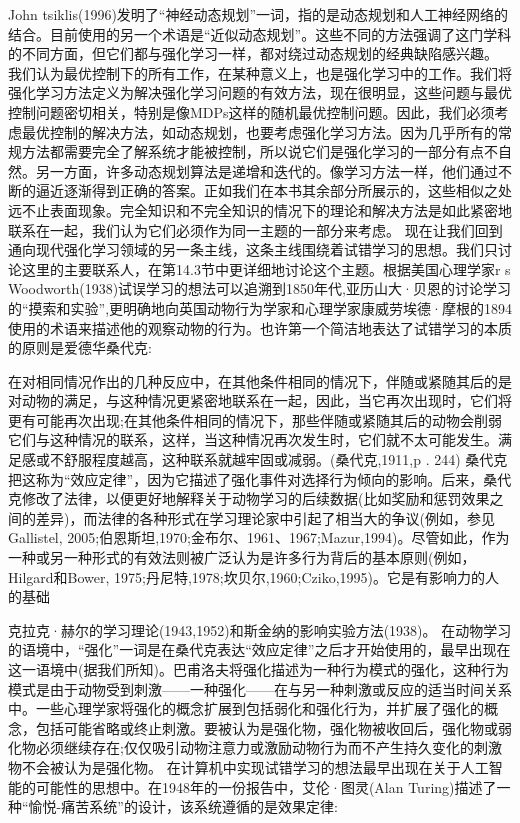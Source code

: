 John tsiklis(1996)发明了“神经动态规划”一词，指的是动态规划和人工神经网络的结合。目前使用的另一个术语是“近似动态规划”。这些不同的方法强调了这门学科的不同方面，但它们都与强化学习一样，都对绕过动态规划的经典缺陷感兴趣。
我们认为最优控制下的所有工作，在某种意义上，也是强化学习中的工作。我们将强化学习方法定义为解决强化学习问题的有效方法，现在很明显，这些问题与最优控制问题密切相关，特别是像MDPs这样的随机最优控制问题。因此，我们必须考虑最优控制的解决方法，如动态规划，也要考虑强化学习方法。因为几乎所有的常规方法都需要完全了解系统才能被控制，所以说它们是强化学习的一部分有点不自然。另一方面，许多动态规划算法是递增和迭代的。像学习方法一样，他们通过不断的逼近逐渐得到正确的答案。正如我们在本书其余部分所展示的，这些相似之处远不止表面现象。完全知识和不完全知识的情况下的理论和解决方法是如此紧密地联系在一起，我们认为它们必须作为同一主题的一部分来考虑。
现在让我们回到通向现代强化学习领域的另一条主线，这条主线围绕着试错学习的思想。我们只讨论这里的主要联系人，在第14.3节中更详细地讨论这个主题。根据美国心理学家r s Woodworth(1938)试误学习的想法可以追溯到1850年代,亚历山大·贝恩的讨论学习的“摸索和实验”,更明确地向英国动物行为学家和心理学家康威劳埃德·摩根的1894使用的术语来描述他的观察动物的行为。也许第一个简洁地表达了试错学习的本质的原则是爱德华桑代克:

在对相同情况作出的几种反应中，在其他条件相同的情况下，伴随或紧随其后的是对动物的满足，与这种情况更紧密地联系在一起，因此，当它再次出现时，它们将更有可能再次出现;在其他条件相同的情况下，那些伴随或紧随其后的动物会削弱它们与这种情况的联系，这样，当这种情况再次发生时，它们就不太可能发生。满足感或不舒服程度越高，这种联系就越牢固或减弱。(桑代克,1911,p . 244)
桑代克把这称为“效应定律”，因为它描述了强化事件对选择行为倾向的影响。后来，桑代克修改了法律，以便更好地解释关于动物学习的后续数据(比如奖励和惩罚效果之间的差异)，而法律的各种形式在学习理论家中引起了相当大的争议(例如，参见Gallistel, 2005;伯恩斯坦,1970;金布尔、1961、1967;Mazur,1994)。尽管如此，作为一种或另一种形式的有效法则被广泛认为是许多行为背后的基本原则(例如，Hilgard和Bower, 1975;丹尼特,1978;坎贝尔,1960;Cziko,1995)。它是有影响力的人的基础

克拉克·赫尔的学习理论(1943,1952)和斯金纳的影响实验方法(1938)。
在动物学习的语境中，“强化”一词是在桑代克表达“效应定律”之后才开始使用的，最早出现在这一语境中(据我们所知)。巴甫洛夫将强化描述为一种行为模式的强化，这种行为模式是由于动物受到刺激——一种强化——在与另一种刺激或反应的适当时间关系中。一些心理学家将强化的概念扩展到包括弱化和强化行为，并扩展了强化的概念，包括可能省略或终止刺激。要被认为是强化物，强化物被收回后，强化物或弱化物必须继续存在;仅仅吸引动物注意力或激励动物行为而不产生持久变化的刺激物不会被认为是强化物。
在计算机中实现试错学习的想法最早出现在关于人工智能的可能性的思想中。在1948年的一份报告中，艾伦·图灵(Alan Turing)描述了一种“愉悦-痛苦系统”的设计，该系统遵循的是效果定律:

